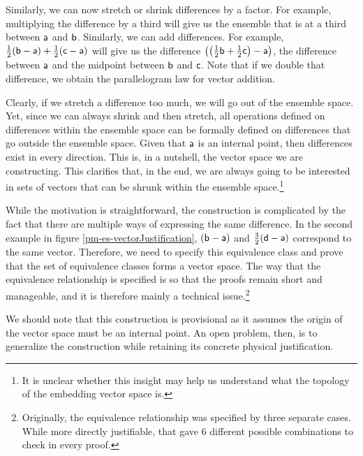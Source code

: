 Similarly, we can now stretch or shrink differences by a factor. For example, multiplying the difference by a third will give us the ensemble that is at a third between $\ens[a]$ and $\ens[b]$. Similarly, we can add differences. For example, $\frac{1}{2}(\ens[b] - \ens[a]) + \frac{1}{2}(\ens[c] - \ens[a])$ will give us the difference $\left(\left(\frac{1}{2}\ens[b] + \frac{1}{2}\ens[c]\right) - \ens[a]\right)$, the difference between $\ens[a]$ and the midpoint between $\ens[b]$ and $\ens[c]$. Note that if we double that difference, we obtain the parallelogram law for vector addition.

Clearly, if we stretch a difference too much, we will go out of the ensemble space. Yet, since we can always shrink and then stretch,  all operations defined on differences within the ensemble space can be formally defined on differences that go outside the ensemble space. Given that $\ens[a]$ is an internal point, then differences exist in every direction. This is, in a nutshell, the vector space we are constructing. This clarifies that, in the end, we are always going to be interested in sets of vectors that can be shrunk within the ensemble space.\footnote{It is unclear whether this insight may help us understand what the topology of the embedding vector space is.}

While the motivation is straightforward, the construction is complicated by the fact that there are multiple ways of expressing the same difference. In the second example in figure \ref{pm-es-vectorJustification}, $(\ens[b] - \ens[a])$ and $\frac{3}{2}(\ens[d] - \ens[a])$ correspond to the same vector. Therefore, we need to specify this equivalence class and prove that the set of equivalence classes forms a vector space. The way that the equivalence relationship is specified is so that the proofs remain short and manageable, and it is therefore mainly a technical issue.\footnote{Originally, the equivalence relationship was specified by three separate cases. While more directly justifiable, that gave 6 different possible combinations to check in every proof.}

We should note that this construction is provisional as it assumes the origin of the vector space must be an internal point. An open problem, then, is to generalize the construction while retaining its concrete physical justification.

